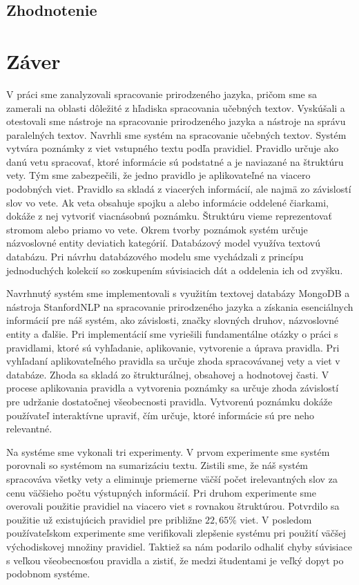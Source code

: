 \newpage
{}
{
	\section{Zhodnotenie}
}
{
	\chapter{Záver}
}
\label{conclusions}
V práci sme zanalyzovali spracovanie prirodzeného jazyka, pričom sme sa zamerali na oblasti dôležité z hľadiska spracovania učebných textov. Vyskúšali a otestovali sme nástroje na spracovanie prirodzeného jazyka a nástroje na správu paralelných textov. Navrhli sme systém na spracovanie učebných textov. Systém vytvára poznámky z viet vstupného textu podľa pravidiel. Pravidlo určuje ako danú vetu spracovať, ktoré informácie sú podstatné a je naviazané na štruktúru vety. Tým sme zabezpečili, že jedno pravidlo je aplikovateľné na viacero podobných viet. Pravidlo sa skladá z viacerých informácií, ale najmä zo závislostí slov vo vete. Ak veta obsahuje spojku a alebo informácie oddelené čiarkami, dokáže z nej vytvoriť viacnásobnú poznámku.  Štruktúru vieme reprezentovať stromom alebo priamo vo vete. Okrem tvorby poznámok systém určuje názvoslovné entity deviatich kategórií. Databázový model využíva textovú databázu. Pri návrhu databázového modelu sme vychádzali z princípu jednoduchých kolekcií so zoskupením súvisiacich dát a oddelenia ich od zvyšku.

Navrhnutý systém sme implementovali s využitím textovej databázy MongoDB a nástroja StanfordNLP na spracovanie prirodzeného jazyka a získania esenciálnych informácií pre náš systém, ako závislosti, značky slovných druhov, názvoslovné entity a ďalšie. Pri implementácií sme vyriešili fundamentálne otázky o práci s pravidlami, ktoré sú vyhľadanie, aplikovanie, vytvorenie a úprava pravidla. Pri vyhľadaní aplikovateľného pravidla sa určuje zhoda spracovávanej vety a viet v databáze. Zhoda sa skladá zo štrukturálnej, obsahovej a hodnotovej časti. V procese aplikovania pravidla a vytvorenia poznámky sa určuje zhoda závislostí pre udržanie dostatočnej všeobecnosti pravidla. Vytvorenú poznámku dokáže používateľ interaktívne upraviť, čím určuje, ktoré informácie sú pre neho relevantné.

Na systéme sme vykonali tri experimenty. V prvom experimente sme systém porovnali so systémom na sumarizáciu textu. Zistili sme, že náš systém spracováva všetky vety a eliminuje priemerne väčší počet irelevantných slov za cenu väčšieho počtu výstupných informácií. Pri druhom experimente sme overovali použitie pravidiel na viacero viet s rovnakou štruktúrou. Potvrdilo sa použitie už existujúcich pravidiel pre približne $22,65\%$ viet. V posledom používateľskom experimente sme verifikovali zlepšenie systému pri použití väčšej východiskovej množiny pravidiel. Taktiež sa nám podarilo odhaliť chyby súvisiace s veľkou všeobecnosťou pravidla a zistiť, že medzi študentami je veľký dopyt po podobnom systéme.

